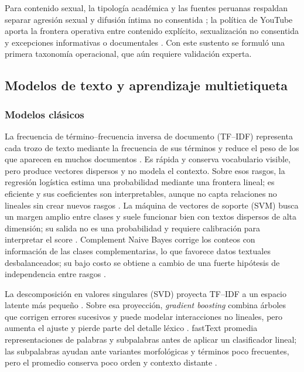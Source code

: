 Para contenido sexual, la tipología académica y las fuentes peruanas respaldan separar agresión sexual y difusión íntima no consentida \cite{banko2020taxonomy,albornoz2018conocer,defensoria2021violenciaenlinea}; la política de YouTube aporta la frontera operativa entre contenido explícito, sexualización no consentida y excepciones informativas o documentales \cite{youtube2026sexualpolicy}. Con este sustento se formuló una primera taxonomía operacional, que aún requiere validación experta.

\subsection{Modelos de texto y aprendizaje multietiqueta}

\subsubsection{Modelos clásicos}

La frecuencia de término--frecuencia inversa de documento (TF--IDF) representa cada trozo de texto mediante la frecuencia de sus términos y reduce el peso de los que aparecen en muchos documentos \cite{sparckjones1972idf,salton1988tfidf}. Es rápida y conserva vocabulario visible, pero produce vectores dispersos y no modela el contexto. Sobre esos rasgos, la regresión logística estima una probabilidad mediante una frontera lineal; es eficiente y sus coeficientes son interpretables, aunque no capta relaciones no lineales sin crear nuevos rasgos \cite{cox1958logistic}. La máquina de vectores de soporte (SVM) busca un margen amplio entre clases y suele funcionar bien con textos dispersos de alta dimensión; su salida no es una probabilidad y requiere calibración para interpretar el score \cite{cortes1995svm}. Complement Naive Bayes corrige los conteos con información de las clases complementarias, lo que favorece datos textuales desbalanceados; su bajo costo se obtiene a cambio de una fuerte hipótesis de independencia entre rasgos \cite{rennie2003cnb}.

La descomposición en valores singulares (SVD) proyecta TF--IDF a un espacio latente más pequeño \cite{deerwester1990lsa}. Sobre esa proyección, \emph{gradient boosting} combina árboles que corrigen errores sucesivos y puede modelar interacciones no lineales, pero aumenta el ajuste y pierde parte del detalle léxico \cite{friedman2001gbm}. fastText promedia representaciones de palabras y subpalabras antes de aplicar un clasificador lineal; las subpalabras ayudan ante variantes morfológicas y términos poco frecuentes, pero el promedio conserva poco orden y contexto distante \cite{joulin2017fasttext}.

